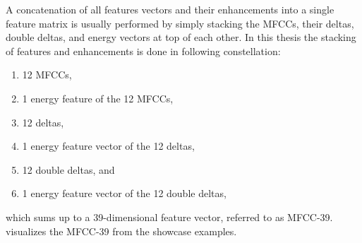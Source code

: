 A concatenation of all features vectors and their enhancements into a single feature matrix is usually performed by simply stacking the MFCCs, their deltas, double deltas, and energy vectors at top of each other.
In this thesis the stacking of features and enhancements is done in following constellation:
\begin{enumerate}
    \item 12 MFCCs,
    \item 1 energy feature of the 12 MFCCs,
    \item 12 deltas,
    \item 1 energy feature vector of the 12 deltas,
    \item 12 double deltas, and
    \item 1 energy feature vector of the 12 double deltas,
\end{enumerate}
which sums up to a 39-dimensional feature vector, referred to as MFCC-39.
 visualizes the MFCC-39 from the showcase examples.

